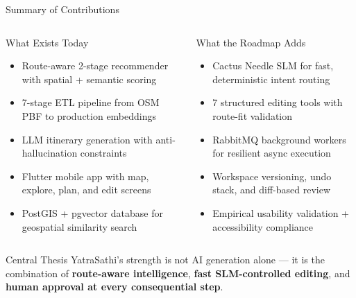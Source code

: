 \documentclass[aspectratio=169,professionalfonts]{beamer}
\newcommand{\hl}[1]{\textbf{\textcolor{ysblue}{#1}}}
\begin{document}
\begin{frame}{Summary of Contributions}
  \begin{columns}[T]
    \begin{block}{What Exists Today}
      \begin{itemize}
        \item Route-aware 2-stage recommender with spatial + semantic scoring
        \item 7-stage ETL pipeline from OSM PBF to production embeddings
        \item LLM itinerary generation with anti-hallucination constraints
        \item Flutter mobile app with map, explore, plan, and edit screens
        \item PostGIS + pgvector database for geospatial similarity search
      \end{itemize}
    \end{block}

    \begin{block}{What the Roadmap Adds}
      \begin{itemize}
        \item Cactus Needle SLM for fast, deterministic intent routing
        \item 7 structured editing tools with route-fit validation
        \item RabbitMQ background workers for resilient async execution
        \item Workspace versioning, undo stack, and diff-based review
        \item Empirical usability validation + accessibility compliance
      \end{itemize}
    \end{block}
  \end{columns}

  \vspace{0.25cm}
  \begin{alertblock}{Central Thesis}
    YatraSathi's strength is not AI generation alone — it is the combination of
    \hl{route-aware intelligence}, \hl{fast SLM-controlled editing}, and
    \hl{human approval at every consequential step}.
  \end{alertblock}
\end{frame}
\end{document}

